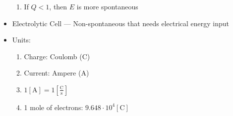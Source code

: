 \documentclass[12pt]{article}
\begin{document}
\begin{itemize}
\begin{enumerate}
      \item If $Q<1$, then $E$ is more spontaneous

    \end{enumerate}

  \item Electrolytic Cell — Non-spontaneous that needs electrical energy input

  \item Units:

    \begin{enumerate}

      \item Charge: Coulomb ($\si{\coulomb}$)

      \item Current: Ampere ($\si{\ampere}$)

      \item $1[\si{\ampere}]=1\left[ \frac{\si{\coulomb}}{\si{\second}} \right]$

      \item 1 mole of electrons: $9.648\cdot10^{4}[\si{\coulomb}]$

    \end{enumerate}

\end{itemize}
\end{document}

